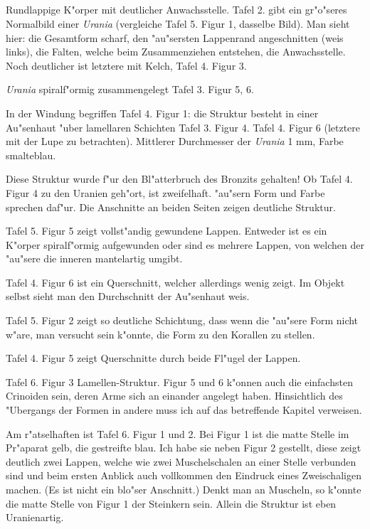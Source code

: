 \documentclass[a4paper, 11pt, oneside]{article}
\begin{document}
\subsection{}
\paragraph{}
Rundlappige K"orper mit deutlicher Anwachsstelle. Tafel 2. gibt ein gr"o"seres Normalbild einer \emph{Urania} (vergleiche Tafel 5. Figur 1, dasselbe Bild). Man sieht hier: die Gesamtform scharf, den "au"sersten Lappenrand angeschnitten (weis links), die Falten, welche beim Zusammenziehen entstehen, die Anwachsstelle. Noch deutlicher ist letztere mit Kelch, Tafel 4. Figur 3.

\emph{Urania} spiralf"ormig zusammengelegt Tafel 3. Figur 5, 6.

In der Windung begriffen Tafel 4. Figur 1: die Struktur besteht in einer Au"senhaut "uber lamellaren Schichten Tafel 3. Figur 4. Tafel 4. Figur 6 (letztere mit der Lupe zu betrachten). Mittlerer Durchmesser der \emph{Urania} 1 mm, Farbe smalteblau.

Diese Struktur wurde f"ur den Bl"atterbruch des Bronzits gehalten! Ob Tafel 4. Figur 4 zu den Uranien geh"ort, ist zweifelhaft. "au"sern Form und Farbe sprechen daf"ur. Die Anschnitte an beiden Seiten zeigen deutliche Struktur.

Tafel 5. Figur 5 zeigt vollst"andig gewundene Lappen. Entweder ist es ein K"orper spiralf"ormig aufgewunden oder sind es mehrere Lappen, von welchen der "au"sere die inneren mantelartig umgibt.

Tafel 4. Figur 6 ist ein Querschnitt, welcher allerdings wenig zeigt. Im Objekt selbst sieht man den Durchschnitt der Au"senhaut weis.

Tafel 5. Figur 2 zeigt so deutliche Schichtung, dass wenn die "au"sere Form nicht w"are, man versucht sein k"onnte, die Form zu den Korallen zu stellen.

Tafel 4. Figur 5 zeigt Querschnitte durch beide Fl"ugel der Lappen.

Tafel 6. Figur 3 Lamellen-Struktur. Figur 5 und 6 k"onnen auch die einfachsten Crinoiden sein, deren Arme sich an einander angelegt haben. Hinsichtlich des "Ubergangs der Formen in andere muss ich auf das betreffende Kapitel verweisen.

Am r"atselhaften ist Tafel 6. Figur 1 und 2. Bei Figur 1 ist die matte Stelle im Pr"aparat gelb, die gestreifte blau. Ich habe sie neben Figur 2 gestellt, diese zeigt deutlich zwei Lappen, welche wie zwei Muschelschalen an einer Stelle verbunden sind und beim ersten Anblick auch vollkommen den Eindruck eines Zweischaligen machen. (Es ist nicht ein blo"ser Anschnitt.) Denkt man an Muscheln, so k"onnte die matte Stelle von Figur 1 der Steinkern sein. Allein die Struktur ist eben Uranienartig.
\end{document}
